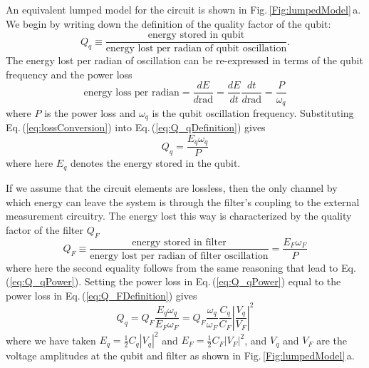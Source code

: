 An equivalent lumped model for the circuit is shown in Fig.\,\ref{Fig:lumpedModel}\,a.
We begin by writing down the definition of the quality factor of the qubit: \begin{equation}
Q_q \equiv \frac{\textrm{energy stored in qubit}}{\textrm{energy lost per radian of qubit oscillation}}. \label{eq:Q_qDefinition} \end{equation}
The energy lost per radian of oscillation can be re-expressed in terms of the qubit frequency and the power loss \begin{equation}
\textrm{energy loss per radian} = \frac{dE}{d\textrm{rad}} = \frac{dE}{dt} \frac{dt}{d\textrm{rad}} = \frac{P}{\omega_q} \label{eq:lossConversion} \end{equation}
where $P$ is the power loss and $\omega_q$ is the qubit oscillation frequency. Substituting Eq.\,(\ref{eq:lossConversion}) into Eq.\,(\ref{eq:Q_qDefinition}) gives \begin{equation}
Q_q = \frac{E_q \omega_q}{P} \label{eq:Q_qPower} \end{equation}
where here $E_q$ denotes the energy stored in the qubit.

If we assume that the circuit elements are lossless, then the only channel by which energy can leave the system is through the filter's coupling to the external measurement circuitry. The energy lost this way is characterized by the quality factor of the filter $Q_F$ \begin{equation}
Q_F \equiv \frac{\textrm{energy stored in filter}}{\textrm{energy lost per radian of filter oscillation}} = \frac{E_F \omega_F}{P} \label{eq:Q_FDefinition} \end{equation}
where here the second equality follows from the same reasoning that lead to Eq.\,(\ref{eq:Q_qPower}). Setting the power loss in Eq.\,(\ref{eq:Q_qPower}) equal to the power loss in Eq.\,(\ref{eq:Q_FDefinition}) gives \begin{equation}
Q_q = Q_F \frac{E_q \omega_q}{E_F \omega_F} = Q_F \frac{\omega_q}{\omega_F} \frac{C_q}{C_F} \left| \frac{V_q}{V_F}\right|^2 \label{eq:Q_qVoltage} \end{equation}
where we have taken $E_q = \frac{1}{2}C_q \left| V_q \right|^2$ and $E_F = \frac{1}{2} C_F \left| V_F \right|^2$, and $V_q$ and $V_F$ are the voltage amplitudes at the qubit and filter as shown in Fig.\,\ref{Fig:lumpedModel}\,a.

